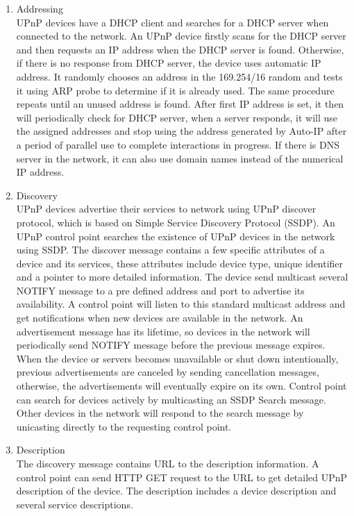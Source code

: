 \begin{enumerate}
\item Addressing \\
UPnP devices have a DHCP client and searches for a DHCP server when connected to the network. 
An UPnP device firstly scans for the DHCP server and then requests an IP address when the DHCP 
server is found. Otherwise, if there is no response from DHCP server, the device uses automatic 
IP address. It randomly chooses an address in the 169.254/16 random and tests it using ARP probe 
to determine if it is already used. The same procedure repeats until an unused address is found. 
After first IP address is set, it then will periodically check for DHCP server, when a server 
responds, it will use the assigned addresses and stop using the address generated by Auto-IP 
after a period of parallel use to complete interactions in progress.
If there is DNS server in the network, it can also use domain names instead of the numerical IP address.
\item Discovery \\
UPnP devices advertise their services to network using UPnP discover protocol, which is based on 
Simple Service Discovery Protocol (SSDP). An UPnP control point searches the existence of 
UPnP devices in the network using SSDP. The discover message contains a few specific attributes 
of a device and its services, these attributes include device type, unique identifier and a 
pointer to more detailed information.
The device send multicast several NOTIFY message to a pre defined address and port to advertise 
its availability. A control point will listen to this standard multicast address and get 
notifications when new devices are available in the network.
An advertisement message has its lifetime, so devices in the network will periodically send 
NOTIFY message before the previous message expires. When the device or servers becomes unavailable 
or shut down intentionally, previous advertisements are canceled by sending cancellation messages, 
otherwise, the advertisements will eventually expire on its own.
Control point can search for devices actively by multicasting an SSDP Search message. Other devices 
in the network will respond to the search message by unicasting directly to the requesting control point.
\item Description \\
The discovery message contains URL to the description information. A control point can send HTTP 
GET request to the URL to get detailed UPnP description of the device. The description includes 
a device description and several service descriptions. 


\end{enumerate}
